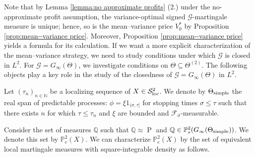 \documentclass[11pt,a4paper,twoside,openany]{report}
\numberwithin{equation}{section}
\theoremstyle{plain} %
\theoremstyle{definition} %
\theoremstyle{remark} %
\begin{document}
Note that by Lemma \ref{lemma:no approximate profits} (2.) under the no-approximate profit assumption, the variance-optimal signed \(\mathcal{G}\)-martingale measure is unique; hence, so is the mean--variance price \(V_0^*\) by Proposition \ref{prop:mean--variance price}. Moreover, Proposition \ref{prop:mean--variance price} yields a formula for its calculation. 
If we want a more explicit characterization of the mean--variance strategy, we need to study conditions under which \(\mathcal{G}\) is closed in \(L^2\). For \(\mathcal{G}=G_{\infty}(\Theta)\), we investigate conditions on \(\Theta\subseteq\Theta^{(2)}\). The following objects play a key role in the study of the closedness of \(\mathcal{G}=G_{\infty}(\Theta)\) in \(L^2\). 




Let \((\tau_n)_{n\in\mathbb{N}}\) be a localizing sequence of \(X\in\mathcal{S}^2_{\rm{loc}}\). We denote by \(\Theta_{\rm{simple}}\) the real span of predictable processes: \(\phi=\xi 1_{(\sigma,\tau]}\) for stopping times \(\sigma\leq\tau\) such that there exists \(n\) for which \(\tau\leq\tau_n\) and \(\xi\) are bounded and \(\mathcal{F}_{\sigma}\)-measurable. 


Consider the set of measures \(\mathbb{Q}\) such that \(\mathbb{Q}\approx\mathop{P}\) and \(\mathbb{Q}\in\mathbb{P}_s^2(G_{\infty}(\Theta_{\rm{simple}}))\).
We denote this set by \(\mathbb{P}^2_e(X)\). We can characterize \(\mathbb{P}^2_e(X)\) by the set of equivalent local martingale measures with square-integrable density as follows.
\end{document}
